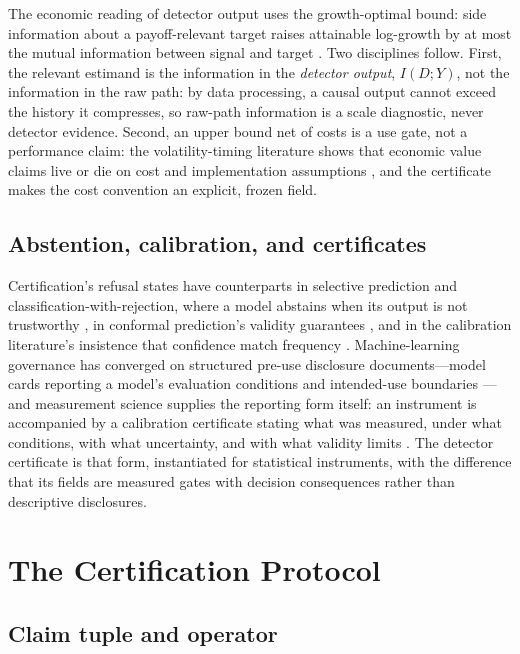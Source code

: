 \documentclass[3p]{elsarticle}
\begin{document}
The economic reading of detector output uses the growth-optimal bound: side
information about a payoff-relevant target raises attainable log-growth by at
most the mutual information between signal and target
\citep{Kelly1956,AlgoetCover1988,BarronCover1988,CoverThomas2006}. Two
disciplines follow. First, the relevant estimand is the information in the
\emph{detector output}, $I(D;Y)$, not the information in the raw path: by
data processing, a causal output cannot exceed the history it compresses, so
raw-path information is a scale diagnostic, never detector evidence. Second,
an upper bound net of costs is a use gate, not a performance claim: the
volatility-timing literature shows that economic value claims live or die on
cost and implementation assumptions \citep{MoreiraMuir2017,Cederburg2020},
and the certificate makes the cost convention an explicit, frozen field.

\subsection{Abstention, calibration, and certificates}

Certification's refusal states have counterparts in selective prediction and
classification-with-rejection, where a model abstains when its output is not
trustworthy \citep{GeifmanElYaniv2017}, in conformal prediction's validity
guarantees \citep{Vovk2005}, and in the calibration literature's insistence
that confidence match frequency \citep{Guo2017}. Machine-learning governance
has converged on structured pre-use disclosure documents---model cards
reporting a model's evaluation conditions and intended-use boundaries
\citep{Mitchell2019}---and measurement science supplies the reporting form
itself: an instrument is accompanied by a calibration certificate stating
what was measured, under what conditions, with what uncertainty, and with
what validity limits \citep{JCGM2008}. The detector certificate is that form,
instantiated for statistical instruments, with the difference that its fields
are measured gates with decision consequences rather than descriptive
disclosures.

\section{The Certification Protocol}
\label{sec:method}

\subsection{Claim tuple and operator}
\end{document}
